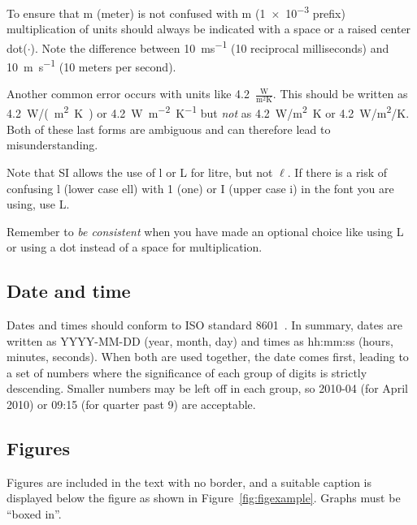 \documentclass[a5paper, 10pt]{article}
\begin{document}
To ensure that m (meter) is not confused with m (\num{1e-3} prefix) multiplication of units should always be indicated with a space or a raised center dot($\cdot$).
Note the difference between \SI{10}{ms^{-1}} (10 reciprocal milliseconds) and \SI{10}{m.s^{-1}} (10 meters per second).

Another common error occurs with units like 
\num{4.2}~$\frac{\mathrm{W}}{\mathrm{m}^2\!\mathrm{K}}$.  
This should be written as \SI{4.2}{W/(m^2.K)} or
\SI{4.2}{W.m^{-2}.K^{-1}} 
but \emph{not} as \SI{4.2}{W/m^2K} or \SI{4.2}{W/m^2/K}.  
Both of these last forms are ambiguous and can therefore lead to misunderstanding.

Note that SI allows the use of l or L for litre, but not $\ell$.
If there is a risk of confusing l (lower case ell) with 1 (one) or I (upper case i) in the font you are using, use L.

Remember to \emph{be consistent} when you have made an optional choice like using L or using a dot instead of a space for multiplication.

\subsection{Date and time}
Dates and times should conform to ISO standard 8601~\citep{isodates}.
In summary, dates are written as YYYY-MM-DD (year, month, day) and times as hh:mm:ss (hours, minutes, seconds).  
When both are used together, the date comes first, leading to a set of numbers where the significance of each group of digits is strictly descending.
Smaller numbers may be left off in each group, so 2010-04 (for April 2010) or 09:15 (for quarter past 9) are acceptable.

\subsection{Figures}
Figures are included in the text with no border, and a suitable caption is displayed below the figure as shown in Figure~\ref{fig:figexample}.
Graphs must be ``boxed in''.
\end{document}
